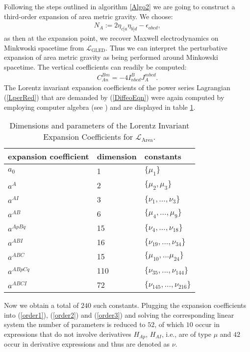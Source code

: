 \documentclass[%
preprint,
nofootinbib,
amsmath,amssymb,
aps,
prd,
floatfix,
]{revtex4-2}
\begin{document}
Following the steps outlined in algorithm \ref{Algo2}
we are going to construct a third-order expansion of area metric gravity.
We choose:
\begin{align}
N_A := 2 \eta_{c[a} \eta_{b]d} - \epsilon_{abcd},
\end{align}
as then at the expansion point, we recover Maxwell electrodynamics on Minkwoski spacetime from $\mathcal{L}_{\text{GLED}}$.
Thus we can interpret the perturbative expansion of area metric gravity as being performed around Minkowski spacetime.
The vertical coefficients can readily be computed:
\begin{align}\label{areaGotayMInter}
    C_{An}^{Bm} = -4 I^B_{nbcd} J_A^{mbcd}.
\end{align}
The Lorentz invariant expansion coefficients of the power series Lagrangian (\ref{LperRed}) that are demanded by (\ref{DiffeoEqn}) were again computed by employing computer algebra (see \cite{sparse-tensor}) and are displayed in table \ref{AreaExp}.
\begin{table}
\centering 
\begin{tabular}{lll} \toprule
    expansion coefficient & dimension & constants   \\ \midrule
    $a_0$ & 1 & $\{\mu_1\}$ \\
    $a^A$ & 2 & $\{\mu_2,\mu_3\}$ \\
    $a^{AI}$ & 3 & $\{\nu_1,..., \nu_3\}$ \\
    $a^{AB}$ & 6 & $\{\mu_4,..., \mu_9 \} $ \\
    $a^{ApBq}$ & 15 & $\{\nu_4,...,\nu_{18}\}$ \\
    $a^{ABI}$ & 16 & $\{ \nu_{19},...,\nu_{34} \}$ \\
    $a^{ABC}$ & 15 & $\{ \mu_{10},...\mu_{24} \}$\\
    $a^{ABpCq}$ & 110 & $\{\nu_{35},...,\nu_{144} \}$ \\
    $a^{ABCI}$ & 72 & $\{ \nu_{145},...,\nu_{216}\}$ \\ \bottomrule
\end{tabular}
\caption{Dimensions and parameters of the Lorentz Invariant Expansion Coefficients for $\mathcal{L}_{\text{Area}}$.}\label{AreaExp}
\end{table}
Now we obtain a total of $240$ such constants. Plugging the expansion coefficients into (\ref{order1}), (\ref{order2}) and (\ref{order3}) and solving the corresponding linear system the number of parameters is reduced to $52$, of which $10$ occur in expressions that do not involve derivatives $H_{Ap}$, $H_{AI}$, i.e., are of type $\mu$ and $42$ occur in derivative expressions and thus are denoted as $\nu$.
\end{document}
